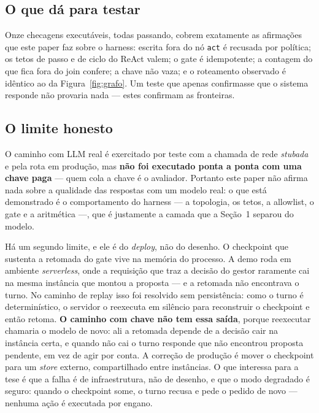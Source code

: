 \documentclass[10pt,twocolumn]{article}
\newcommand{\code}[1]{\texttt{\footnotesize #1}}
\begin{document}
\subsection{O que dá para testar}

Onze checagens executáveis, todas passando, cobrem exatamente as afirmações que este paper
faz sobre o harness: escrita fora do nó \code{act} é recusada por política; os tetos de
passo e de ciclo do ReAct valem; o gate é idempotente; a contagem do que fica fora do join
confere; a chave não vaza; e o roteamento observado é idêntico ao da
Figura~\ref{fig:grafo}. Um teste que apenas confirmasse que o sistema responde não provaria
nada --- estes confirmam as fronteiras.

\subsection{O limite honesto}

O caminho com LLM real é exercitado por teste com a chamada de rede \emph{stubada} e pela
rota em produção, mas \textbf{não foi executado ponta a ponta com uma chave paga} --- quem
cola a chave é o avaliador. Portanto este paper não afirma nada sobre a qualidade das
respostas com um modelo real: o que está demonstrado é o comportamento do harness --- a
topologia, os tetos, a allowlist, o gate e a aritmética ---, que é justamente a camada que a
Seção~1 separou do modelo.

Há um segundo limite, e ele é do \emph{deploy}, não do desenho. O checkpoint que sustenta a
retomada do gate vive na memória do processo. A demo roda em ambiente \emph{serverless}, onde
a requisição que traz a decisão do gestor raramente cai na mesma instância que montou a
proposta --- e a retomada não encontrava o turno. No caminho de replay isso foi resolvido sem
persistência: como o turno é determinístico, o servidor o reexecuta em silêncio para
reconstruir o checkpoint e então retoma. \textbf{O caminho com chave não tem essa saída},
porque reexecutar chamaria o modelo de novo: ali a retomada depende de a decisão cair na
instância certa, e quando não cai o turno responde que não encontrou proposta pendente, em vez
de agir por conta. A correção de produção é mover o checkpoint para um \emph{store} externo,
compartilhado entre instâncias. O que interessa para a tese é que a falha é de infraestrutura,
não de desenho, e que o modo degradado é seguro: quando o checkpoint some, o turno recusa e
pede o pedido de novo --- nenhuma ação é executada por engano.
\end{document}

